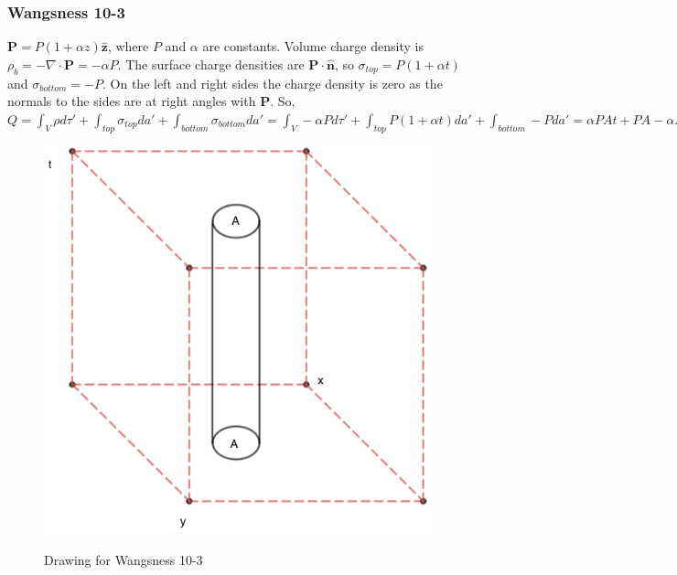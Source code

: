 \documentclass[oneside]{book}
\theoremstyle{mystyle}
\begin{document}
\subsubsection{Wangsness 10-3}
$\mathbf{P}= P(1+\alpha z)\hat{\mathbf{z}}$, where $P$ and $\alpha$ are constants. Volume charge density is $\rho_{b} = -\nabla \cdot \mathbf{P} = -\alpha P$. The surface charge densities are $\mathbf{P}\cdot \hat{\mathbf{n}}$, so $\sigma_{top} = P(1+\alpha t)$ and $\sigma_{bottom} = -P$. On the left and right sides the charge density is zero as the normals to the sides are at right angles with $\mathbf{P}$. So, $Q = \int_{V} \rho d\tau' + \int_{top} \sigma_{top} da' + \int_{bottom} \sigma_{bottom} da' = \int_{V}-\alpha P d\tau' + \int_{top}P(1+\alpha t) da' + \int_{bottom} - Pda' = \alpha PAt + PA - \alpha PA t - PA = 0$
\begin{figure}[htbp]
    \centering
    {\includegraphics[scale=0.4]{10-3.png}}
    \caption{Drawing for Wangsness 10-3}
\end{figure}
\end{document}
